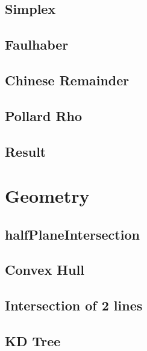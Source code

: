 \documentclass[10pt,twocolumn,oneside]{article}
\begin{document}
\subsection{Simplex}


\subsection{Faulhaber}


\subsection{Chinese Remainder}


\subsection{Pollard Rho}


\subsection{Result}



\section{Geometry}

\subsection{halfPlaneIntersection}



\subsection{Convex Hull}


\subsection{Intersection of 2 lines}


\subsection{KD Tree}

\end{document}
